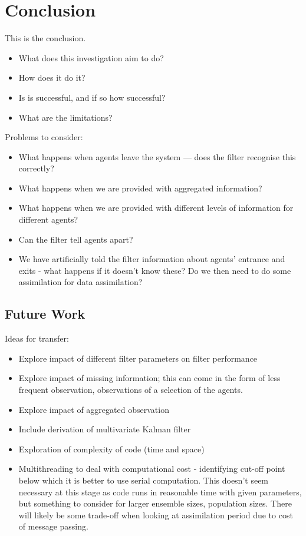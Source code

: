 \chapter{Conclusion}\label{ch:conclusion}

This is the conclusion.
\begin{itemize}
    \item What does this investigation aim to do?
    \item How does it do it?
    \item Is is successful, and if so how successful?
    \item What are the limitations?
\end{itemize}

Problems to consider:
\begin{itemize}
    \item What happens when agents leave the system --- does the filter
        recognise this correctly?
    \item What happens when we are provided with aggregated information?
    \item What happens when we are provided with different levels of information
        for different agents?
    \item Can the filter tell agents apart?
    \item We have artificially told the filter information about agents'
        entrance and exits - what happens if it doesn't know these? Do we then
        need to do some assimilation for data assimilation?
\end{itemize}

\section{Future Work}\label{sec:conc:future}

Ideas for transfer:
\begin{itemize}
    \item Explore impact of different filter parameters on filter performance
    \item Explore impact of missing information; this can come in the form of
        less frequent observation, observations of a selection of the agents.
    \item Explore impact of aggregated observation
    \item Include derivation of multivariate Kalman filter
    \item Exploration of complexity of code (time and space)
    \item Multithreading to deal with computational cost - identifying cut-off
        point below which it is better to use serial computation. This doesn't
        seem necessary at this stage as code runs in reasonable time with given
        parameters, but something to consider for larger ensemble sizes,
        population sizes. There will likely be some trade-off when looking at
        assimilation period due to cost of message passing.
\end{itemize}

